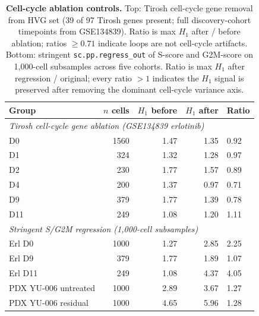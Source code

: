 \begin{table}[htbp]
  \centering
  \caption{\textbf{Cell-cycle ablation controls.}
  Top: Tirosh cell-cycle gene removal from HVG set (39 of 97 Tirosh
  genes present; full discovery-cohort timepoints from GSE134839).
  Ratio is max $H_1$ after / before ablation; ratios $\geq 0.71$
  indicate loops are not cell-cycle artifacts.
  Bottom: stringent \texttt{sc.pp.regress\_out} of S-score and G2M-score
  on 1{,}000-cell subsamples across five cohorts. Ratio is max $H_1$
  after regression / original; every ratio $> 1$ indicates the $H_1$
  signal is preserved after removing the dominant cell-cycle variance
  axis.}
  \label{tab:cc_controls}
  \begin{tabularx}{0.95\linewidth}{l r r r l}
    \toprule
    Group & $n$ cells & $H_1$ before & $H_1$ after & Ratio \\
    \midrule
    \multicolumn{5}{l}{\emph{Tirosh cell-cycle gene ablation (GSE134839 erlotinib)}} \\
    \midrule
    D0  & 1560 & 1.47 & 1.35 & 0.92 \\
    D1  &  324 & 1.32 & 1.28 & 0.97 \\
    D2  &  230 & 1.77 & 1.57 & 0.89 \\
    D4  &  200 & 1.37 & 0.97 & 0.71 \\
    D9  &  379 & 1.77 & 1.39 & 0.78 \\
    D11 &  249 & 1.08 & 1.20 & 1.11 \\
    \midrule
    \multicolumn{5}{l}{\emph{Stringent S/G2M regression (1{,}000-cell subsamples)}} \\
    \midrule
    Erl D0               & 1000 & 1.27 & 2.85 & 2.25 \\
    Erl D9               &  379 & 1.77 & 1.89 & 1.07 \\
    Erl D11              &  249 & 1.08 & 4.37 & 4.05 \\
    PDX YU-006 untreated & 1000 & 2.89 & 3.67 & 1.27 \\
    PDX YU-006 residual  & 1000 & 4.65 & 5.96 & 1.28 \\
    \bottomrule
  \end{tabularx}
\end{table}
